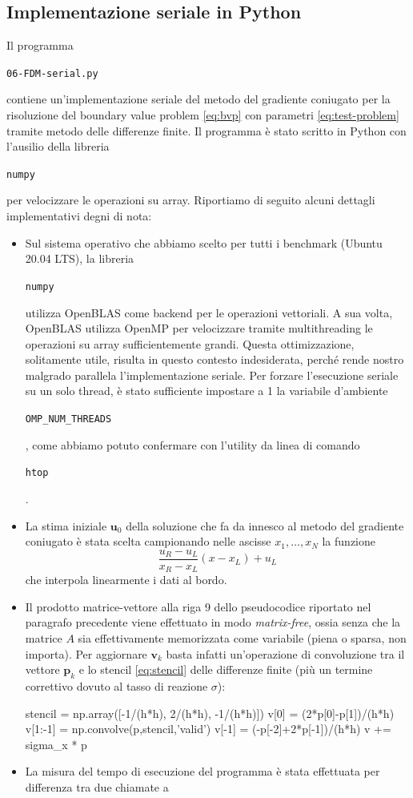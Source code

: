 \documentclass[a4paper,11pt]{article}
\renewcommand{\vec}[1]{\bm{#1}}
\newcommand{\code}[1]{\begin{small}\texttt{#1}\end{small}}
\begin{document}
\subsection{Implementazione seriale in Python}
Il programma \code{06-FDM-serial.py} contiene un'implementazione
seriale del metodo del gradiente coniugato per la risoluzione
del boundary value problem \eqref{eq:bvp} con parametri
\eqref{eq:test-problem} tramite metodo delle differenze finite.
Il programma è stato scritto in Python con l'ausilio della
libreria \code{numpy} per velocizzare le operazioni su array.
Riportiamo di seguito alcuni dettagli implementativi degni
di nota:
\begin{itemize}
\item Sul sistema operativo che abbiamo scelto per tutti i benchmark
(Ubuntu 20.04 LTS), la libreria \code{numpy} utilizza
OpenBLAS come backend per le operazioni vettoriali.
A sua volta, OpenBLAS utilizza OpenMP per velocizzare
tramite multithreading le operazioni su array
sufficientemente grandi.
Questa ottimizzazione, solitamente utile, risulta in
questo contesto indesiderata, perché rende nostro malgrado
parallela l'implementazione seriale.
Per forzare l'esecuzione seriale su un solo thread,
è stato sufficiente impostare a 1 la variabile d'ambiente
\code{OMP\_NUM\_THREADS}, come abbiamo potuto confermare
con l'utility da linea di comando \code{htop}.
\item La stima iniziale $\vec{u}_0$ della soluzione
che fa da innesco al metodo del gradiente coniugato
è stata scelta campionando nelle ascisse $x_1,\dots,x_N$
la funzione
\[
\frac{u_R-u_L}{x_R-x_L} (x - x_L) + u_L
\]
che interpola linearmente i dati al bordo.
\item Il prodotto matrice-vettore alla riga 9 dello
pseudocodice riportato nel paragrafo precedente viene
effettuato in modo \emph{matrix-free}, ossia senza che la
matrice $A$ sia effettivamente memorizzata come variabile
(piena o sparsa, non importa). Per aggiornare $\vec{v}_k$ basta
infatti un'operazione di convoluzione tra il vettore $\vec{p}_k$
e lo stencil \eqref{eq:stencil} delle differenze finite
(più un termine correttivo dovuto al tasso di reazione $\sigma$):
\begin{python}
stencil = np.array([-1/(h*h), 2/(h*h), -1/(h*h)])
v[0] = (2*p[0]-p[1])/(h*h)
v[1:-1] = np.convolve(p,stencil,'valid')
v[-1] = (-p[-2]+2*p[-1])/(h*h)
v += sigma_x * p
\end{python}
\item La misura del tempo di esecuzione del programma è stata
effettuata per differenza tra due chiamate a

\end{itemize}
\end{document}
